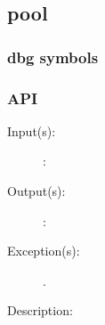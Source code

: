 %
%
%
%
%              

\subsection{pool}
\label{pool}

\subsubsection{dbg symbols}

\subsubsection{API}
\begin{description}
\label{pool_}
\item[{\cfunc[]{pool\_}{}}: ]
	\begin{description}\item[]
	\item[Input(s): ]
		\begin{description}\item[]
		\item[: ]
		\end{description}
	\item[Output(s): ]
		\begin{description}\item[]
		\item[: ]
		\end{description}
	\item[Exception(s): ]
		\begin{description}\item[]
		\item[.]
		\end{description}
	\item[Description: ]
	\end{description}
\end{description}
